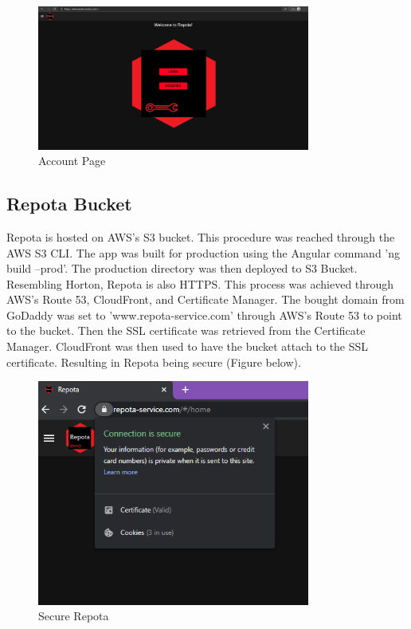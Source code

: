 \begin{figure}[H]
    \centering
    \caption{Account Page}
    \label{image:accountPage}
    \includegraphics[width=0.8\textwidth]{images/repota/UI/account.png}
\end{figure}

\subsection{Repota Bucket}
Repota is hosted on AWS's S3 bucket. This procedure was reached through the AWS S3 CLI. The app was built for production using the Angular command 'ng build --prod'. The production directory was then deployed to S3 Bucket. Resembling Horton, Repota is also HTTPS. This process was achieved through AWS's Route 53, CloudFront, and Certificate Manager. The bought domain from GoDaddy was set to 'www.repota-service.com' through AWS's Route 53 to point to the bucket. Then the SSL certificate was retrieved from the Certificate Manager. CloudFront was then used to have the bucket attach to the SSL certificate. Resulting in Repota being secure (Figure below).

\begin{figure}[H]
    \centering
    \caption{Secure Repota}
    \label{image:secureRepota}
    \includegraphics[width=0.8\textwidth]{images/aws/secure_repota.png}
\end{figure}